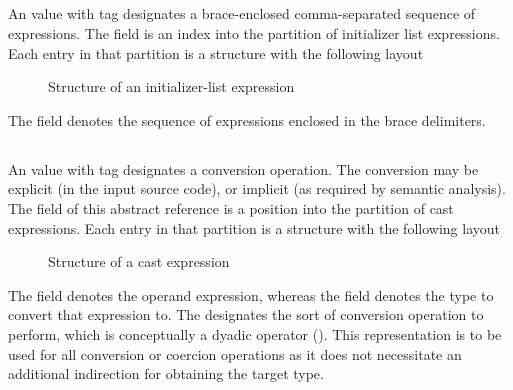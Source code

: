 
\subsection{}
\label{sec:ifc:ExprSort:InitializerList}

An  value with tag  designates a brace-enclosed comma-separated 
sequence of expressions.
The  field is an index into the partition of initializer list expressions.
Each entry in that partition is a structure with the following layout
%
\begin{figure}[H]
	\centering
	\caption{Structure of an initializer-list expression}
	\label{fig:ifc-initializer-list-structure}
\end{figure}
%
The  field denotes the sequence of expressions enclosed in the brace delimiters.




\subsection{}
\label{sec:ifc:ExprSort:Cast}

An  value with tag  designates a conversion operation.
The conversion may be explicit (in the input source code), or implicit (as required by semantic analysis).
The  field of this abstract reference  is a position into the partition of cast expressions.
Each entry in that partition is a structure with the following layout
%
\begin{figure}[H]
	\centering
	\caption{Structure of a cast expression}
	\label{fig:ifc:ExprSort:Cast}
\end{figure}
%
The  field denotes the operand expression, whereas the  field denotes
the type to convert that expression to.  The  designates the sort of conversion operation
to perform, which is conceptually a dyadic operator ().  This representation
is to be used for all conversion or coercion operations as it does not necessitate 
an additional indirection for obtaining the target type.

